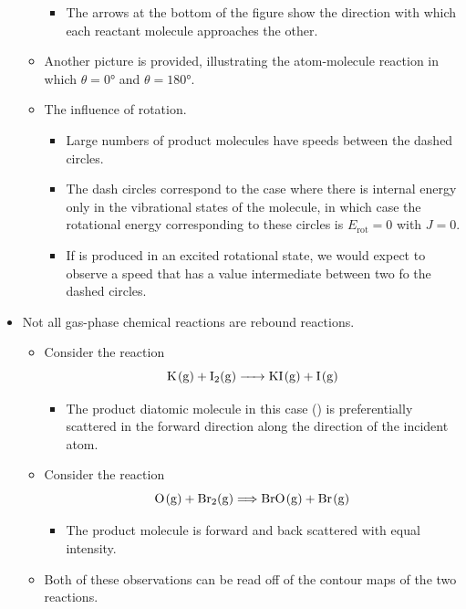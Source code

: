 \documentclass[../notes.tex]{subfiles}
\begin{document}
\begin{itemize}
\begin{itemize}
\begin{itemize}
            \item The arrows at the bottom of the figure show the direction with which each reactant molecule approaches the other.
        \end{itemize}
        \item Another picture is provided, illustrating the atom-molecule reaction  in which $\theta=\ang{0}$ and $\theta=\ang{180}$.
        \item The influence of rotation.
        \begin{itemize}
            \item Large numbers of product molecules have speeds between the dashed circles.
            \item The dash circles correspond to the case where there is internal energy only in the vibrational states of the molecule, in which case the rotational energy corresponding to these circles is $E_\text{rot}=0$ with $J=0$.
            \item If  is produced in an excited rotational state, we would expect to observe a speed that has a value intermediate between two fo the dashed circles.
        \end{itemize}
    \end{itemize}
    \item Not all gas-phase chemical reactions are rebound reactions.
    \begin{itemize}
        \item Consider the reaction
        \begin{equation*}
            \ce{K(g) + I2(g) -> KI(g) + I(g)}
        \end{equation*}
        \begin{itemize}
            \item The product diatomic molecule in this case () is preferentially scattered in the forward direction along the direction of the incident  atom.
        \end{itemize}
        \item Consider the reaction
        \begin{equation*}
            \ce{O(g) + Br2(g)} \Longrightarrow \ce{BrO(g) + Br(g)}
        \end{equation*}
        \begin{itemize}
            \item The product molecule  is forward and back scattered with equal intensity.
        \end{itemize}
        \item Both of these observations can be read off of the contour maps of the two reactions.
    \end{itemize}
\end{itemize}
\end{document}
